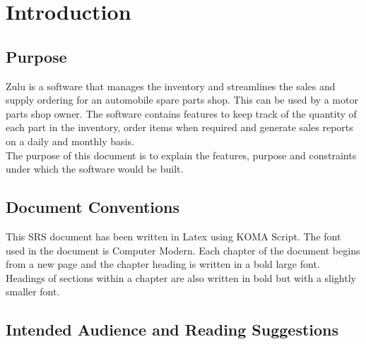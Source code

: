 \documentclass{scrreprt}
\begin{document}
\chapter{Introduction}

\section{Purpose}

Zulu is a software that manages the inventory and streamlines the sales and supply ordering for an automobile spare parts shop. This can be used by a motor parts shop owner. The software contains features to keep track of the quantity of each part in the inventory, order items when required and generate sales reports on a daily and monthly basis.\\ The purpose of this document is to explain the features, purpose and constraints under which the software would be built.

\section{Document Conventions}
This SRS document has been written in Latex using KOMA Script. The font used in the document is Computer Modern. Each chapter of the document begins from a new page and the chapter heading is written in a bold large font. Headings of sections within a chapter are also written in bold but with a slightly smaller font. 

\section{Intended Audience and Reading Suggestions}
\end{document}
